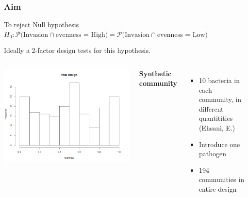 \documentclass[11pt]{beamer}
\begin{document}
\begin{frame}
\frametitle{Aim}
\begin{block}{To reject Null hypothesis}
$
H_0: \mathcal{P(} \text{Invasion} \cap \text{evenness = High)} =\mathcal{P(} \text{Invasion} \cap \text{evenness = Low)}
$
\end{block}
\vspace*{.05in}
Ideally a 2-factor design tests for this hypothesis.

\begin{columns}[c] %

\begingroup
    \fontsize{10pt}{12pt}\selectfont
  \includegraphics[scale = .15]{finalplot.png}

\endgroup
{} %

\textbf{Synthetic community}
\begin{itemize}
\item 10 bacteria in each community, in different quantitities \\(Ehsani, E.)
\item Introduce one  pathogen
\item 194 communities in entire design
\end{itemize}

\end{columns}
\end{frame}
\end{document}
